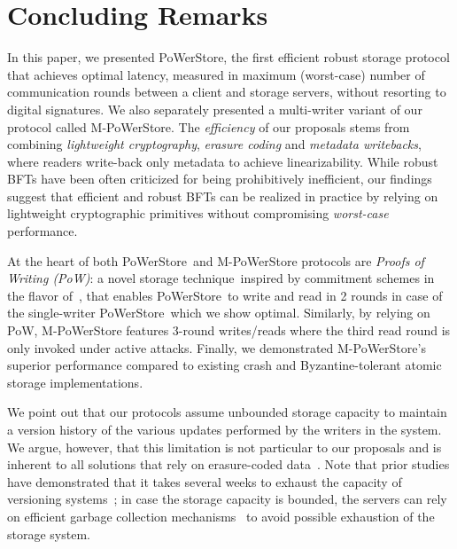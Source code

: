 \documentclass[10pt,conference,compsocconf]{IEEEtran}
\newcommand{\protocol}{PoWerStore}
\newcommand{\mprotocol}{M-PoWerStore}
\newcommand{\scheme}{storage technique}
\begin{document}
\section{Concluding Remarks}
\label{sec:conclusion}

In this paper, we presented \protocol, the first efficient
robust storage protocol that achieves optimal latency, measured
in maximum (worst-case) number of communication rounds between a client and storage servers, without resorting to digital signatures.
We also separately presented a multi-writer variant of our protocol called \mprotocol.  The \emph{efficiency} of our proposals stems from combining \emph{lightweight cryptography}, \emph{erasure coding} and  \emph{metadata writebacks}, where readers write-back only metadata to achieve linearizability. While robust BFTs have been often criticized for being prohibitively inefficient, our findings suggest that efficient and robust BFTs can be realized
in practice by relying on lightweight cryptographic primitives without compromising \emph{worst-case} performance.

At the heart of both \protocol\ and \mprotocol{} protocols are \emph{Proofs of Writing (PoW)}: a novel \scheme\ inspired by commitment schemes in the flavor of~\cite{Halevi1996}, that enables \protocol\ to write and read in 2 rounds in case of the single-writer \protocol\ which we show optimal.
Similarly, by relying on PoW, \mprotocol{} features 3-round writes/reads where the third read round is only invoked under active attacks.
Finally, we  demonstrated \mprotocol's superior performance compared to existing crash and Byzantine-tolerant atomic storage implementations.

We point out that our protocols assume unbounded storage capacity to maintain a version history of
the various updates performed by the writers in the system. We argue, however, that this limitation is not particular to our proposals and is inherent to all
solutions that rely on erasure-coded data~\cite{Soules2003}. Note that prior studies have demonstrated that it takes several weeks to exhaust the capacity of versioning systems~\cite{Strunk2000}; in case the storage capacity is bounded, the servers can rely on efficient garbage collection mechanisms~\cite{GWGR04} to avoid possible exhaustion of the storage system.
\end{document}
